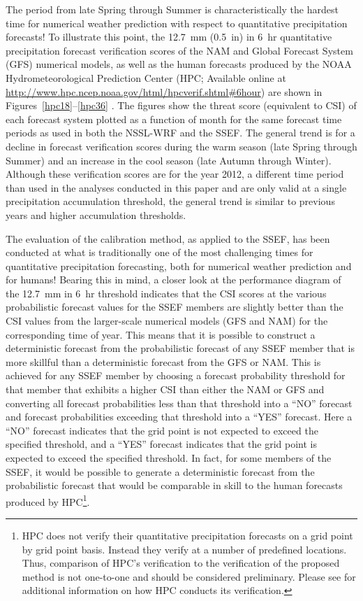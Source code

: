 The period from late Spring through Summer is characteristically the hardest time for numerical weather prediction with respect to quantitative precipitation forecasts!
To illustrate this point, the \mbox{12.7 mm} (\mbox{0.5 in}) in \mbox{6 hr} quantitative precipitation forecast verification scores of the NAM and Global Forecast System (GFS) numerical models, as well as the human forecasts produced by the NOAA Hydrometeorological Prediction Center (HPC; Available online at \url{http://www.hpc.ncep.noaa.gov/html/hpcverif.shtml#6hour}) are shown in \mbox{Figures \ref{hpc18}--\ref{hpc36}} .
The figures show the threat score (equivalent to CSI) of each forecast system plotted as a function of month for the same forecast time periods as used in both the NSSL-WRF and the SSEF.
The general trend is for a decline in forecast verification scores during the warm season (late Spring through Summer) and an increase in the cool season (late Autumn through Winter).
Although these verification scores are for the year 2012, a different time period than used in the analyses conducted in this paper and are only valid at a single precipitation accumulation threshold, the general trend is similar to previous years and higher accumulation thresholds.


The evaluation of the calibration method, as applied to the SSEF, has been conducted at what is traditionally one of the most challenging times for quantitative precipitation forecasting, both for numerical weather prediction and for humans!
Bearing this in mind, a closer look at the performance diagram of the \mbox{12.7 mm} in \mbox{6 hr} threshold indicates that the CSI scores at the various probabilistic forecast values for the SSEF members are slightly better than the CSI values from the larger-scale numerical models (GFS and NAM) for the corresponding time of year.
This means that it is possible to construct a deterministic forecast from the probabilistic forecast of any SSEF member that is more skillful than a deterministic forecast from the GFS or NAM.
This is achieved for any SSEF member by choosing a forecast probability threshold for that member that exhibits a higher CSI than either the NAM or GFS and converting all forecast probabilities less than that threshold into a ``NO'' forecast and forecast probabilities exceeding that threshold into a ``YES'' forecast.
Here a ``NO'' forecast indicates that the grid point is not expected to exceed the specified threshold, and a ``YES'' forecast indicates that the grid point is expected to exceed the specified threshold.
In fact, for some members of the SSEF, it would be possible to generate a deterministic forecast from the probabilistic forecast that would be comparable in skill to the human forecasts produced by HPC\footnote{HPC does not verify their quantitative precipitation forecasts on a grid point by grid point basis.
Instead they verify at a number of predefined locations.
Thus, comparison of HPC's verification to the verification of the proposed method is not one-to-one and should be considered preliminary.
Please see \cite{Olsen1995} for additional information on how HPC conducts its verification.}.


